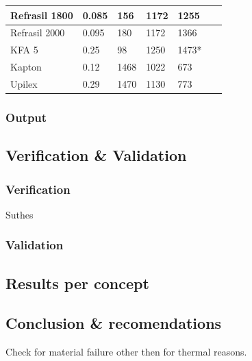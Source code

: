 \begin{table}[H]
\begin{tabular}{|l|l|l|l|l|l|}
    Refrasil 1800      & 0.085                                                 & 156                                        & 1172                                            & 1255 	 & ~                                          \\ \hline
    Refrasil 2000      & 0.095                                                 & 180                                        & 1172                                            & 1366 	 & ~                                          \\ \hline
    KFA 5             & 0.25                                                  & 98                                         & 1250                                            & 1473* 	 & ~                                          \\ \hline
    Kapton            & 0.12                                                  & 1468                                       & 1022                                            & 673	 & ~                                          \\ \hline
    Upilex            & 0.29                                                  & 1470                                       & 1130                                            & 773 	 & ~                                          \\ \hline
    \end{tabular}
    \label{tab:tpsmatprop}
\end{table}

\subsubsection{Output}


\subsection{Verification \& Validation}

\subsubsection{Verification}
Suthes
\subsubsection{Validation}



\subsection{Results per concept}



\subsection{Conclusion \& recomendations}
Check for material failure other then for thermal reasons.
